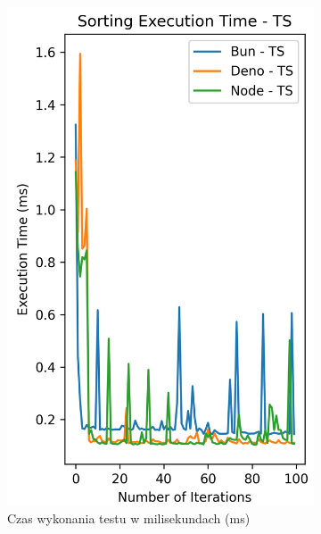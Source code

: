 \begin{figure}[H]
  \centering
  \begin{subfigure}[b]{0.42\textwidth}
    \centering
    \includegraphics[width=\textwidth]{Figures/sorting/sorting_radix_100_1000_ts_time.png}
    \caption{Czas wykonania testu w milisekundach (ms)}
    \label{fig:radix_sorting_e1_ts_time}
  \end{subfigure}
  \begin{subfigure}[b]{0.42\textwidth}
    \centering

\end{subfigure}
\end{figure}
